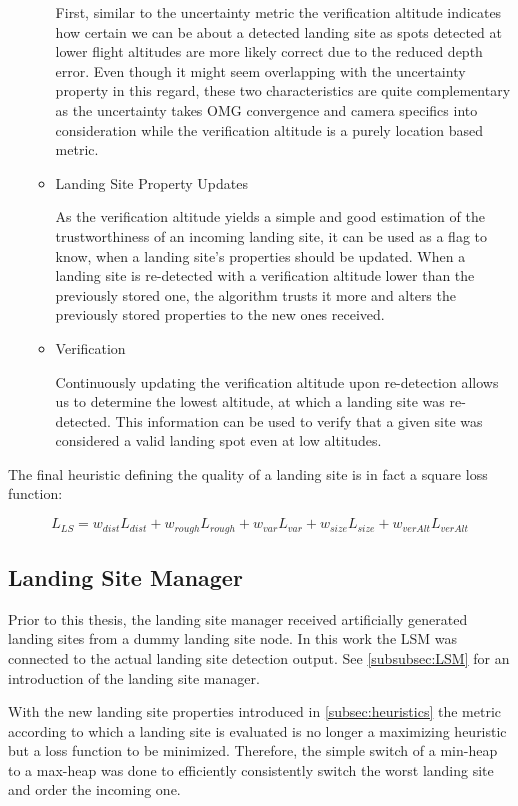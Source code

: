 \begin{itemize}
\begin{itemize}
        First, similar to the uncertainty metric the verification altitude indicates how certain we can be about a detected landing site as spots detected at lower flight altitudes are more likely correct due to the reduced depth error. Even though it might seem overlapping with the uncertainty property in this regard, these two characteristics are quite complementary as the uncertainty takes OMG convergence and camera specifics into consideration while the verification altitude is a purely location based metric.
        \item Landing Site Property Updates

        As the verification altitude yields a simple and good estimation of the trustworthiness of an incoming landing site, it can be used as a flag to know, when a landing site's properties should be updated. When a landing site is re-detected with a verification altitude lower than the previously stored one, the algorithm trusts it more and alters the previously stored properties to the new ones received.
        \item Verification

        Continuously updating the verification altitude upon re-detection allows us to determine the lowest altitude, at which a landing site was re-detected. This information can be used to verify that a given site was considered a valid landing spot even at low altitudes. 
    \end{itemize}
\end{itemize}

The final heuristic defining the quality of a landing site is in fact a square loss function:

\begin{equation}
    L_{LS} = w_{dist}L_{dist} + w_{rough}L_{rough} + w_{var}L_{var} + w_{size}L_{size} + w_{verAlt}L_{verAlt}
    \label{eq:loss_fct}
\end{equation}


\subsection{Landing Site Manager}

Prior to this thesis, the landing site manager received artificially generated landing sites from a dummy landing site node. In this work the LSM was connected to the actual landing site detection output. See \cref{subsubsec:LSM} for an introduction of the landing site manager.

With the new landing site properties introduced in \cref{subsec:heuristics} the metric according to which a landing site is evaluated is no longer a maximizing heuristic but a loss function to be minimized. Therefore, the simple switch of a min-heap to a max-heap was done to efficiently consistently switch the worst landing site and order the incoming one.

